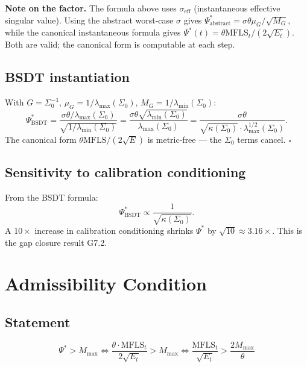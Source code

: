 \documentclass[11pt,a4paper]{article}
\theoremstyle{definition}
\newcommand{\mfls}{\mathrm{MFLS}}
\newcommand{\bsdt}{\mathrm{BSDT}}
\begin{document}
\textbf{Note on the factor.} The formula above uses $\sigma_\mathrm{eff}$ (instantaneous effective singular value). Using the abstract worst-case $\sigma$ gives $\Psi^*_\text{abstract} = \sigma\theta\mu_G/\sqrt{M_G}$, while the canonical instantaneous formula gives $\Psi^*(t) = \theta\mfls_t/(2\sqrt{E_t})$. Both are valid; the canonical form is computable at each step.

\subsection{BSDT instantiation}

With $G = \Sigma_0^{-1}$, $\mu_G = 1/\lambda_\mathrm{max}(\Sigma_0)$, $M_G = 1/\lambda_\mathrm{min}(\Sigma_0)$:
\[
\Psi^*_\bsdt = \frac{\sigma\theta/\lambda_\mathrm{max}(\Sigma_0)}{\sqrt{1/\lambda_\mathrm{min}(\Sigma_0)}}
= \frac{\sigma\theta\sqrt{\lambda_\mathrm{min}(\Sigma_0)}}{\lambda_\mathrm{max}(\Sigma_0)}
= \frac{\sigma\theta}{\sqrt{\kappa(\Sigma_0)}\cdot\lambda_\mathrm{max}^{1/2}(\Sigma_0)}.
\]
The canonical form $\theta\mfls/(2\sqrt{E})$ is metric-free — the $\Sigma_0$ terms cancel. $\square$

\subsection{Sensitivity to calibration conditioning}

From the BSDT formula:
\[
\Psi^*_\bsdt \propto \frac{1}{\sqrt{\kappa(\Sigma_0)}}.
\]
A $10\times$ increase in calibration conditioning shrinks $\Psi^*$ by $\sqrt{10} \approx 3.16\times$.
This is the gap closure result G7.2.

\section{Admissibility Condition}

\subsection{Statement}

\begin{lockedbox}
\[
\Psi^* > M_\mathrm{max} \iff \frac{\theta\cdot\mfls_t}{2\sqrt{E_t}} > M_\mathrm{max}
\iff \frac{\mfls_t}{\sqrt{E_t}} > \frac{2M_\mathrm{max}}{\theta}
\]
\end{lockedbox}
\end{document}
